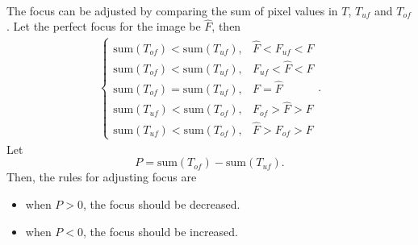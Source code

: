 \documentclass[12pt, twocolumn]{report}
\begin{document}
\paragraph{}
The focus can be adjusted by comparing the sum of pixel values in $T$, $T_{uf}$ and $T_{of}$. Let the perfect focus for the image be $\hat{F}$, then
\begin{align*}
\begin{cases}
    \text{sum}(T_{of}) < \text{sum}(T_{uf}), & \hat{F} < F_{uf} < F\\
    \text{sum}(T_{of}) < \text{sum}(T_{uf}), & F_{uf} < \hat{F} < F \\
    \text{sum}(T_{of}) = \text{sum}(T_{uf}), & F = \hat{F} \\
    \text{sum}(T_{uf}) < \text{sum}(T_{of}), & F_{of} > \hat{F} > F \\
    \text{sum}(T_{uf}) < \text{sum}(T_{of}), & \hat{F} > F_{of} > F
\end{cases}.
\end{align*}
Let
\begin{equation}
    P = \text{sum}(T_{of}) - \text{sum}(T_{uf}).
\end{equation}
Then, the rules for adjusting focus are
\begin{itemize}
    \item when $P>0$, the focus should be decreased.
    \item when $P<0$, the focus should be increased.
\end{itemize}
\end{document}
